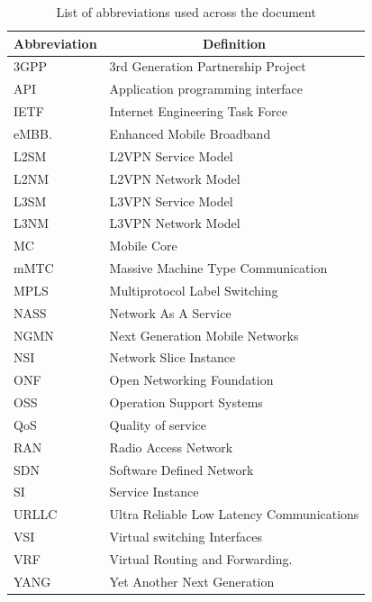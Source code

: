 \documentclass[journal,article,submit,moreauthors,pdftex]{Definitions/mdpi}
\begin{document}
\begin{table}[htb!]
\caption{List of abbreviations used across the document}
\label{tab:abbreviations}
\begin{tabular}{|l|l|}
\hline
Abbreviation & \multicolumn{1}{c|}{Definition}              \\ \hline
3GPP         & 3rd Generation Partnership Project           \\ \hline
API          & Application programming interface            \\ \hline
IETF         & Internet Engineering Task Force              \\ \hline
eMBB.        & Enhanced Mobile Broadband                    \\ \hline
L2SM         & L2VPN Service Model                          \\ \hline
L2NM         & L2VPN Network Model                          \\ \hline
L3SM         & L3VPN Service Model                          \\ \hline
L3NM         & L3VPN Network Model                          \\ \hline
MC           & Mobile Core                                  \\ \hline
mMTC         & Massive Machine Type Communication           \\ \hline
MPLS         & Multiprotocol Label Switching                \\ \hline
NASS         & Network As A Service                         \\ \hline
NGMN         & Next Generation Mobile Networks              \\ \hline
NSI          & Network Slice Instance                       \\ \hline
ONF          & Open Networking Foundation                   \\ \hline
OSS          & Operation Support Systems                    \\ \hline
QoS          & Quality of service                           \\ \hline
RAN          & Radio Access Network                         \\ \hline
SDN          & Software Defined Network                     \\ \hline
SI           & Service Instance                             \\ \hline
URLLC        & Ultra Reliable Low Latency Communications    \\ \hline
VSI          & Virtual switching Interfaces                 \\ \hline
VRF          & Virtual Routing and Forwarding.              \\ \hline
YANG         & Yet Another Next Generation                  \\ \hline
\end{tabular}
\end{table}
\end{document}
